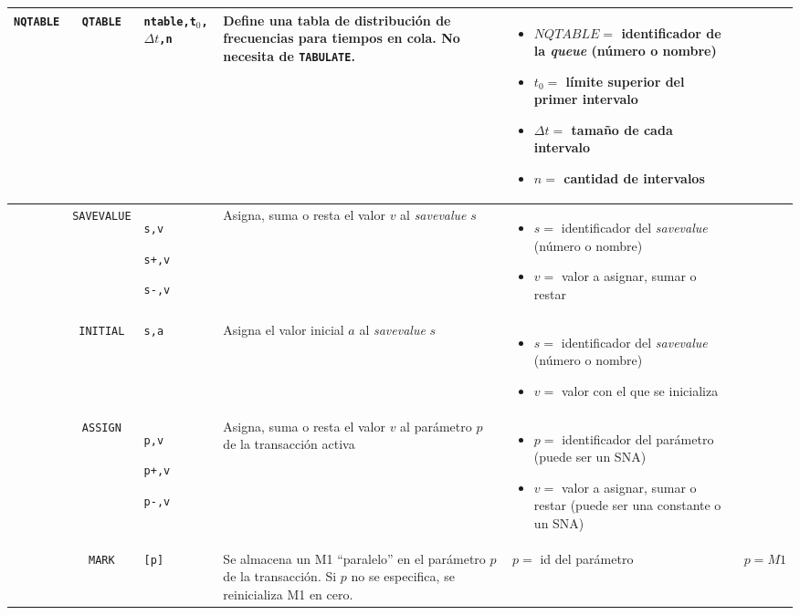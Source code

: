 \documentclass{article}
\providecommand{\tabularnewline}{\\}
\begin{document}
\begin{longtable}{|lc>{\raggedright}p{}|>{\raggedright}p{}|>{\raggedright}p{}|>{\raggedright}p{}|}
\hline
\texttt{NQTABLE} & \texttt{QTABLE} & \texttt{ntable,t$_{0}$,$\Delta t$,n} &
Define una tabla de distribución de frecuencias para tiempos en cola. No necesita de \texttt{TABULATE}. &
\begin{itemize}
  \item $NQTABLE=$ identificador de la \emph{queue} (número o nombre)
  \item $t_{0}=$ límite superior del primer intervalo
  \item $\Delta t=$ tamaño de cada intervalo
  \item $n=$ cantidad de intervalos
\end{itemize} & \tabularnewline

\hline
& \texttt{SAVEVALUE} &
\texttt{s,v}

\texttt{s+,v}

\texttt{s-,v} &
Asigna, suma o resta el valor $v$ al \emph{savevalue} $s$ &
\begin{itemize}
  \item $s=$ identificador del \emph{savevalue} (número o nombre)
  \item $v=$ valor a asignar, sumar o restar
\end{itemize} & \tabularnewline

\hline
& \texttt{INITIAL} & \texttt{s,a} &
Asigna el valor inicial $a$ al \emph{savevalue} $s$ &
\begin{itemize}
  \item $s=$ identificador del \emph{savevalue} (número o nombre)
  \item $v=$ valor con el que se inicializa
\end{itemize} & \tabularnewline

\hline
& \texttt{ASSIGN} &
\texttt{p,v}

\texttt{p+,v}

\texttt{p-,v} &
Asigna, suma o resta el valor $v$ al parámetro $p$ de la transacción activa &

\begin{itemize}
  \item $p=$ identificador del parámetro (puede ser un SNA)
  \item $v=$ valor a asignar, sumar o restar (puede ser una constante o un SNA)
\end{itemize} & \tabularnewline

\hline
& \texttt{MARK} & \texttt{[p]} &
Se almacena un M1 ``paralelo'' en el parámetro $p$ de la transacción.
Si $p$ no se especifica, se reinicializa M1 en cero. &
$p=$ id del parámetro & $p=M1$ \tabularnewline


\end{longtable}
\end{document}
